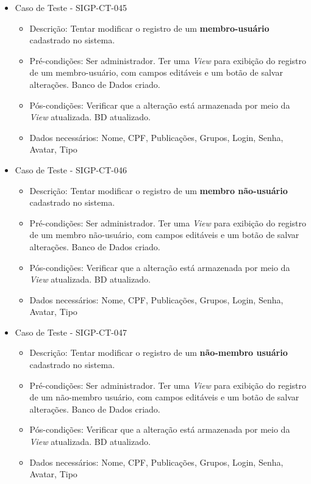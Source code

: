 \documentclass[11pt, a4paper]{book}
\begin{document}
\begin{itemize}
	\item  Caso de Teste - SIGP-CT-045
	\begin{itemize}
	\item Descrição: Tentar modificar o registro de um \textbf{membro-usuário} cadastrado no sistema.
	\item Pré-condições: Ser administrador. Ter uma \emph{View} para exibição do registro de um membro-usuário, com campos editáveis e um botão de salvar alterações. Banco de Dados criado.
	\item Pós-condições:  Verificar que a alteração está armazenada por meio da \emph{View} atualizada. BD atualizado.
	\item Dados necessários: Nome, CPF, Publicações, Grupos, Login, Senha, Avatar, Tipo
	\end{itemize}

	\item Caso de Teste - SIGP-CT-046
	\begin{itemize}
	\item Descrição: Tentar modificar o registro de um  \textbf{membro não-usuário} cadastrado no sistema.
	\item Pré-condições: Ser administrador. Ter uma \emph{View} para exibição do registro de um membro não-usuário, com campos editáveis e um botão de salvar alterações. Banco de Dados criado.
	\item Pós-condições:  Verificar que a alteração está armazenada por meio da \emph{View} atualizada. BD atualizado.
	\item Dados necessários: Nome, CPF, Publicações, Grupos, Login, Senha, Avatar, Tipo
	\end{itemize}

\newpage

	\item Caso de Teste - SIGP-CT-047
	\begin{itemize}
	\item Descrição: Tentar modificar o registro de um  \textbf{não-membro usuário} cadastrado no sistema.
	\item Pré-condições: Ser administrador. Ter uma \emph{View} para exibição do registro de um não-membro usuário, com campos editáveis e um botão de salvar alterações. Banco de Dados criado.
	\item Pós-condições:  Verificar que a alteração está armazenada por meio da \emph{View} atualizada. BD atualizado.
	\item Dados necessários:  Nome, CPF, Publicações, Grupos, Login, Senha, Avatar, Tipo
	\end{itemize}


\end{itemize}
\end{document}
